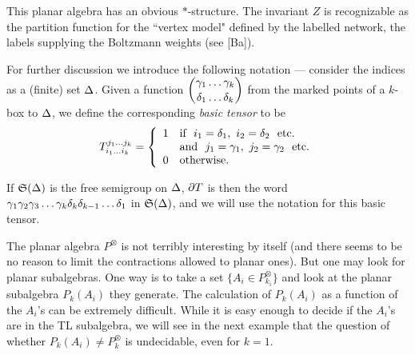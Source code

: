 This planar algebra has an obvious
$*$-structure. The invariant $Z$ is recognizable as the partition
function for the ``vertex model" defined by the labelled network,
the labels supplying the Boltzmann weights (see [Ba]).

For further discussion we introduce the following notation ---
consider the indices as a (finite) set $\Delta$. Given a function
$\displaystyle{{\gamma_1\ldots \gamma_k}\choose {\delta_1 \ldots  \delta_k}}$  
from the marked
points of a $k$-box to $\Delta$, we define the corresponding
{\it basic tensor} to be
\[ 
T^{j_1\dots j_k}_{i_1\dots i_k}= \left\{
		\begin{array}{ll}
		1 & {\mbox{if}}\ \ i_1=\d_1, \ i_2=\d_2 {\mbox{ \ etc.}}\\ 
		{} & {\mbox{and}} \ \ j_1=\g_1, \ j_2=\g_2 {\mbox{ \ etc.}}\\
		0 & {\mbox{otherwise.}}
		\end{array}
	\right.
\]

If $\frak S(\Delta)$ is the free semigroup on $\Delta$, $\partial T$ is then the
word \newline $\gamma_1\gamma_2\gamma_3\dots \gamma_k\delta_k\delta_{k-1}\dots\delta_1$ in $\frak S(\Delta)$, and we will use
the notation
for this basic tensor.

The planar algebra $P^\otimes$ is not terribly interesting by
itself (and there seems  to be no reason to limit the contractions
allowed to planar ones). But one may look for planar subalgebras.
One way is to take a set $\{A_i\in P^\otimes_{k_i}\}$ and look at
the planar subalgebra $P_k(A_i)$ they generate. The calculation of
$P_k(A_i)$ as a function of the $A_i$'s can be extremely difficult.
While it is easy enough to decide if the $A_i$'s are in the TL
subalgebra, we will see in the next example that the question of
whether $P_k(A_i)\neq P_k^{\otimes}$ is undecidable, even for $k=1$.

